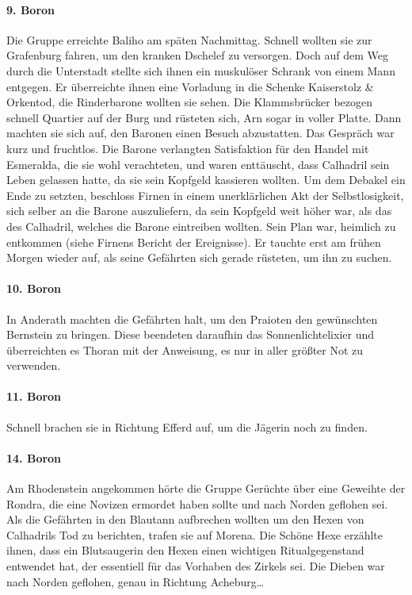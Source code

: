 \paragraph{9. Boron}
Die Gruppe erreichte Baliho am späten Nachmittag. Schnell wollten sie zur Grafenburg fahren, um den kranken Dschelef zu versorgen. Doch auf dem Weg durch die Unterstadt stellte sich ihnen ein muskulöser Schrank von einem Mann entgegen. Er überreichte ihnen eine Vorladung in die Schenke Kaiserstolz \& Orkentod, die Rinderbarone wollten sie sehen. Die Klammsbrücker bezogen schnell Quartier auf der Burg und rüsteten sich, Arn sogar in voller Platte. Dann machten sie sich auf, den Baronen einen Besuch abzustatten.
Das Gespräch war kurz und fruchtlos. Die Barone verlangten Satisfaktion für den Handel mit Esmeralda, die sie wohl verachteten, und waren enttäuscht, dass Calhadril sein Leben gelassen hatte, da sie sein Kopfgeld kassieren wollten. Um dem Debakel ein Ende zu setzten, beschloss Firnen in einem unerklärlichen Akt der Selbstlosigkeit, sich selber an die Barone auszuliefern, da sein Kopfgeld weit höher war, als das des Calhadril, welches die Barone eintreiben wollten. Sein Plan war, heimlich zu entkommen (siehe Firnens Bericht der Ereignisse).
Er tauchte erst am frühen Morgen wieder auf, als seine Gefährten sich gerade rüsteten, um ihn zu suchen.

\paragraph{10. Boron}
In Anderath machten die Gefährten halt, um den Praioten den gewünschten Bernstein zu bringen. Diese beendeten daraufhin das Sonnenlichtelixier und überreichten es Thoran mit der Anweisung, es nur in aller größter Not zu verwenden.

\paragraph{11. Boron}
Schnell brachen sie in Richtung Efferd auf, um die Jägerin noch zu finden.

\paragraph{14. Boron}
Am Rhodenstein angekommen hörte die Gruppe Gerüchte über eine Geweihte der Rondra, die eine Novizen ermordet haben sollte und nach Norden geflohen sei. Als die Gefährten in den Blautann aufbrechen wollten um den Hexen von Calhadrils Tod zu berichten, trafen sie auf Morena. Die Schöne Hexe erzählte ihnen, dass ein Blutsaugerin den Hexen einen wichtigen Ritualgegenstand entwendet hat, der essentiell für das Vorhaben des Zirkels sei. Die Dieben war nach Norden geflohen, genau in Richtung Acheburg\dots \par


